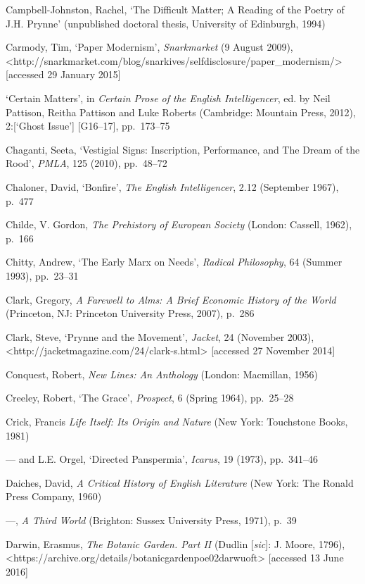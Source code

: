 \documentclass[]{article}
\begin{document}
Campbell-Johnston, Rachel, `The Difficult Matter; A Reading of the
Poetry of J.H. Prynne' (unpublished doctoral thesis, University of
Edinburgh, 1994)

Carmody, Tim, `Paper Modernism', \emph{Snarkmarket} (9 August 2009),\\
\textless{}http://snarkmarket.com/blog/snarkives/selfdisclosure/paper\_modernism/\textgreater{}
{[}accessed 29 January 2015{]}

`Certain Matters', in \emph{Certain Prose of the English Intelligencer},
ed. by Neil Pattison, Reitha Pattison and Luke Roberts (Cambridge:
Mountain Press, 2012), 2:{[}`Ghost Issue'{]} {[}G16--17{]}, pp.~173--75

Chaganti, Seeta, `Vestigial Signs: Inscription, Performance, and The
Dream of the Rood', \emph{PMLA}, 125 (2010), pp.~48--72

Chaloner, David, `Bonfire', \emph{The English Intelligencer}, 2.12
(September 1967), p.~477

Childe, V. Gordon, \emph{The Prehistory of European Society} (London:
Cassell, 1962), p.~166

Chitty, Andrew, `The Early Marx on Needs', \emph{Radical Philosophy}, 64
(Summer 1993), pp.~23--31

Clark, Gregory, \emph{A Farewell to Alms: A Brief Economic History of
the World} (Princeton, NJ: Princeton University Press, 2007), p.~286

Clark, Steve, `Prynne and the Movement', \emph{Jacket}, 24 (November
2003),\\
\textless{}http://jacketmagazine.com/24/clark-s.html\textgreater{}
{[}accessed 27 November 2014{]}

Conquest, Robert, \emph{New Lines: An Anthology} (London: Macmillan,
1956)

Creeley, Robert, `The Grace', \emph{Prospect}, 6 (Spring 1964),
pp.~25--28

Crick, Francis \emph{Life Itself: Its Origin and Nature} (New York:
Touchstone Books, 1981)

--- and L.E. Orgel, `Directed Panspermia', \emph{Icarus}, 19 (1973),
pp.~341--46

Daiches, David, \emph{A Critical History of English Literature} (New
York: The Ronald Press Company, 1960)

---, \emph{A Third World} (Brighton: Sussex University Press, 1971),
p.~39

Darwin, Erasmus, \emph{The Botanic Garden. Part II} (Dudlin
{[}\emph{sic}{]}: J. Moore, 1796),\\
\textless{}https://archive.org/details/botanicgardenpoe02darwuoft\textgreater{}
{[}accessed 13 June 2016{]}
\end{document}
